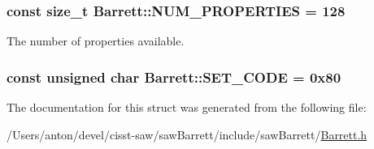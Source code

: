 \subsubsection[{N\+U\+M\+\_\+\+P\+R\+O\+P\+E\+R\+T\+I\+E\+S}]{\setlength{\rightskip}{0pt plus 5cm}const size\+\_\+t Barrett\+::\+N\+U\+M\+\_\+\+P\+R\+O\+P\+E\+R\+T\+I\+E\+S = 128\hspace{0.3cm}{\ttfamily [static]}}\label{struct_barrett_a3b28e2fed33c0ad184808bbed86551c0}


The number of properties available. 

\hypertarget{struct_barrett_a746e1d4f09073391ae23fecb646ab0f9}{}
\subsubsection[{S\+E\+T\+\_\+\+C\+O\+D\+E}]{\setlength{\rightskip}{0pt plus 5cm}const unsigned char Barrett\+::\+S\+E\+T\+\_\+\+C\+O\+D\+E = 0x80\hspace{0.3cm}{\ttfamily [static]}}\label{struct_barrett_a746e1d4f09073391ae23fecb646ab0f9}


The documentation for this struct was generated from the following file\+:\begin{DoxyCompactItemize}
\item 
/\+Users/anton/devel/cisst-\/saw/saw\+Barrett/include/saw\+Barrett/\hyperlink{_barrett_8h}{Barrett.\+h}\end{DoxyCompactItemize}
